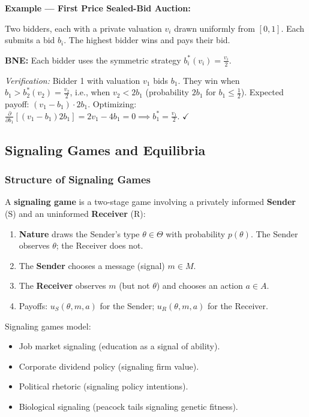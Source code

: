 \documentclass[hidelinks]{article}
\begin{document}
\textbf{Example — First Price Sealed-Bid Auction:}

Two bidders, each with a private valuation $v_i$ drawn uniformly from $[0,1]$. Each submits a bid $b_i$. The highest bidder wins and pays their bid.

\textbf{BNE:} Each bidder uses the symmetric strategy $b_i^*(v_i) = \frac{v_i}{2}$.

\textit{Verification:} Bidder 1 with valuation $v_1$ bids $b_1$. They win when $b_1 > b_2^*(v_2) = \frac{v_2}{2}$, i.e., when $v_2 < 2b_1$ (probability $2b_1$ for $b_1 \leq \frac{1}{2}$). Expected payoff: $(v_1 - b_1) \cdot 2b_1$. Optimizing: $\frac{\partial}{\partial b_1}[(v_1 - b_1)2b_1] = 2v_1 - 4b_1 = 0 \implies b_1^* = \frac{v_1}{2}$. $\checkmark$

\subsection{Signaling Games and Equilibria}

\subsubsection{Structure of Signaling Games}

A \textbf{signaling game} is a two-stage game involving a privately informed \textbf{Sender} (S) and an uninformed \textbf{Receiver} (R):

\begin{enumerate}
    \item \textbf{Nature} draws the Sender's type $\theta \in \Theta$ with probability $p(\theta)$. The Sender observes $\theta$; the Receiver does not.
    \item The \textbf{Sender} chooses a message (signal) $m \in M$.
    \item The \textbf{Receiver} observes $m$ (but not $\theta$) and chooses an action $a \in A$.
    \item Payoffs: $u_S(\theta, m, a)$ for the Sender; $u_R(\theta, m, a)$ for the Receiver.
\end{enumerate}

Signaling games model:
\begin{itemize}
    \item Job market signaling (education as a signal of ability).
    \item Corporate dividend policy (signaling firm value).
    \item Political rhetoric (signaling policy intentions).
    \item Biological signaling (peacock tails signaling genetic fitness).
\end{itemize}
\end{document}

